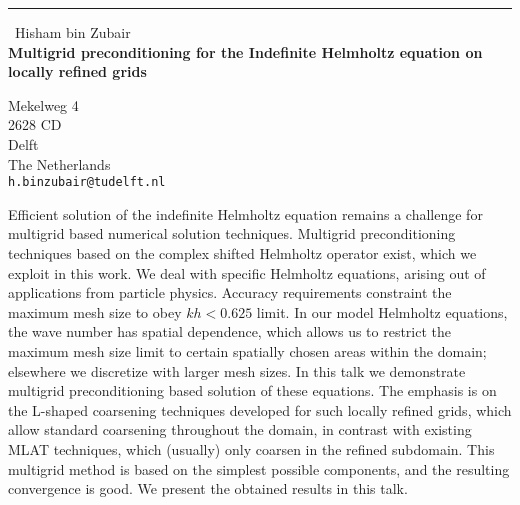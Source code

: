 \documentclass{report}
\begin{document}
\begin{center}
\rule{6in}{1pt} \
{\large Hisham bin Zubair \\
{\bf Multigrid preconditioning for the Indefinite Helmholtz equation on locally refined grids}}

Mekelweg 4 \\ 2628 CD \\ Delft \\ The Netherlands
\\
{\tt h.binzubair@tudelft.nl}\end{center}

Efficient solution of the indefinite Helmholtz equation remains a
challenge for multigrid based numerical solution techniques. Multigrid
preconditioning techniques based on the complex shifted Helmholtz
operator exist, which we exploit in this work. We deal with specific
Helmholtz equations, arising out of applications from particle physics.
Accuracy requirements constraint the maximum mesh size to obey $kh <
0.625$ limit. In our model Helmholtz equations, the wave number has
spatial dependence, which allows us to restrict the maximum mesh size
limit to certain spatially chosen areas within the domain; elsewhere we
discretize with larger mesh sizes. In this talk we demonstrate multigrid
preconditioning based solution of these equations. The emphasis is on the
L-shaped coarsening techniques developed for such locally refined grids,
which allow standard coarsening throughout the domain, in contrast with
existing MLAT techniques, which (usually) only coarsen in the refined
subdomain. This multigrid method is based on the simplest possible
components, and the resulting convergence is good. We present the
obtained results in this talk.
\end{document}
